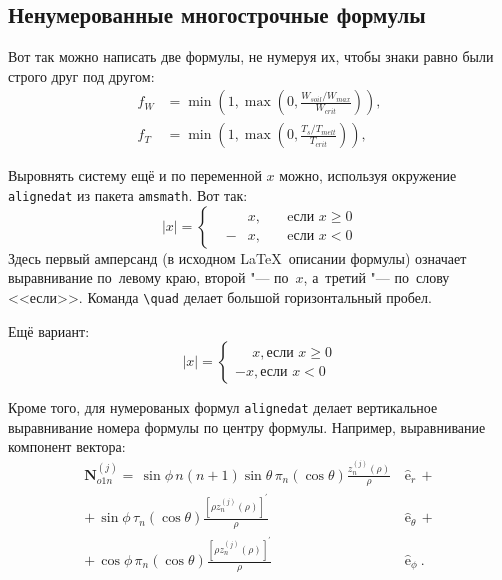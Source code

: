 {{{{\subsection{Ненумерованные многострочные формулы} \label{subsect1_3_2}

Вот так можно написать две формулы, не нумеруя их, чтобы знаки равно были строго друг под другом:
\begin{align}
  f_W & =  \min \left( 1, \max \left( 0, \frac{W_{soil} / W_{max}}{W_{crit}} \right)  \right), \nonumber \\
  f_T & =  \min \left( 1, \max \left( 0, \frac{T_s / T_{melt}}{T_{crit}} \right)  \right), \nonumber
\end{align}

Выровнять систему ещё и по переменной $ x $ можно, используя окружение \verb|alignedat| из пакета \verb|amsmath|. Вот так: 
\[
    |x| = \left\{
    \begin{alignedat}{2}
        &&x, \quad &\text{eсли } x\geqslant 0 \\
        &-&x, \quad & \text{eсли } x<0
    \end{alignedat}
    \right.
\]
Здесь первый амперсанд (в исходном \LaTeX\ описании формулы) означает выравнивание по~левому краю, второй "--- по~$ x $, а~третий "--- по~слову <<если>>. Команда \verb|\quad| делает большой горизонтальный пробел.

Ещё вариант:
\[
    |x|=
    \begin{cases}
    \phantom{-}x, \text{если } x \geqslant 0 \\
    -x, \text{если } x<0
    \end{cases}
\]

Кроме того, для  нумерованых формул \verb|alignedat|  делает вертикальное
выравнивание номера формулы по центру формулы. Например,  выравнивание компонент вектора:
\begin{equation}
 \label{eq:2p3}
 \begin{alignedat}{2}
{\mathbf{N}}_{o1n}^{(j)} = \,{\sin} \phi\,n\!\left(n+1\right)
         {\sin}\theta\,
         \pi_n\!\left({\cos} \theta\right)
         \frac{
               z_n^{(j)}\!\left( \rho \right)
              }{\rho}\,
           &{\boldsymbol{\hat{\mathrm e}}}_{r}\,+   \\
+\,
{\sin} \phi\,
         \tau_n\!\left({\cos} \theta\right)
         \frac{
            \left[\rho z_n^{(j)}\!\left( \rho \right)\right]^{\prime}
              }{\rho}\,
            &{\boldsymbol{\hat{\mathrm e}}}_{\theta}\,+   \\
+\,
{\cos} \phi\,
         \pi_n\!\left({\cos} \theta\right)
         \frac{
            \left[\rho z_n^{(j)}\!\left( \rho \right)\right]^{\prime}
              }{\rho}\,
            &{\boldsymbol{\hat{\mathrm e}}}_{\phi}\:.
\end{alignedat}
\end{equation}

}}}}
